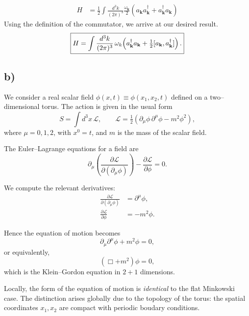 \documentclass[12pt]{article}
\newcommand{\wk}{\omega_{\mathbf{k}}}
\begin{document}
\begin{align*}
    H &= \frac{1}{2} \int \frac{d^3k}{(2\pi)^3} \frac{\wk}{2}
    \left(a_{\mathbf{k}}a_{\mathbf{k}}^{\dagger} + a_{\mathbf{k}}^{\dagger}a_{\mathbf{k}} \right)
\end{align*}
Using the definition of the commutator, we arrive at our desired result.
\[
\boxed{%
H=\int\frac{d^3k}{(2\pi)^3}\,\omega_k\!\left(a_{\mathbf{k}}^\dagger a_{\mathbf{k}}
+\tfrac{1}{2}[a_{\mathbf{k}},a_{\mathbf{k}}^\dagger]\right).}
\]


\subsection*{b)}
We consider a real scalar field $\phi(x,t) \equiv \phi(x_1,x_2,t)$ defined on a
two--dimensional torus. The action is given in the usual form
\begin{equation}
    S = \int d^3x \, \mathcal{L}, \qquad 
    \mathcal{L} = \tfrac{1}{2}\left( \partial_\mu \phi \, \partial^\mu \phi 
    - m^2 \phi^2 \right),
\end{equation}
where $\mu = 0,1,2$, with $x^0 = t$, and $m$ is the mass of the scalar field.

The Euler--Lagrange equations for a field are
\begin{equation}
    \partial_\mu \left( \frac{\partial \mathcal{L}}
    {\partial (\partial_\mu \phi)} \right) 
    - \frac{\partial \mathcal{L}}{\partial \phi} = 0.
\end{equation}

We compute the relevant derivatives:
\begin{align}
    \frac{\partial \mathcal{L}}{\partial(\partial_\mu \phi)} 
        &= \partial^\mu \phi, \\
    \frac{\partial \mathcal{L}}{\partial \phi} 
        &= - m^2 \phi.
\end{align}

Hence the equation of motion becomes
\begin{equation}
    \partial_\mu \partial^\mu \phi + m^2 \phi = 0,
\end{equation}
or equivalently,
\begin{equation}
    (\Box + m^2)\phi = 0,
\end{equation}
which is the Klein--Gordon equation in $2+1$ dimensions.


Locally, the form of the equation of motion is \emph{identical} to the flat
Minkowski case. The distinction arises globally due to the topology of the
torus: the spatial coordinates $x_1, x_2$ are compact with periodic
boudary conditions.
\end{document}
